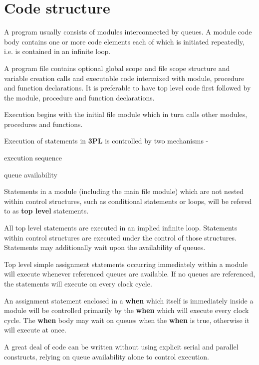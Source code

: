 \pagebreak

\chapter{Code structure}

    A program usually consists of modules interconnected by queues. A module
    code body contains one or more code elements each of which is initiated
    repeatedly, i.e. is contained in an infinite loop.

    A program file contains optional global scope and file scope structure and
    variable creation calls and executable code intermixed with module,
    procedure and function declarations. It is preferable to have
    top level code first followed by the module, procedure and function
    declarations.
    
    Execution begins with the initial file module which in turn calls other
    modules, procedures and functions.

    Execution of statements in {\bf 3PL} is controlled by two mechanisms -
    \blist
    \item    execution sequence
    \item    queue availability
    \blend
    
    Statements in a module (including the main file module) which are not nested
    within control structures, such as conditional statements or loops, will be
    refered to as {\bf top level} statements.

    All top level statements are executed in an implied infinite loop.
    Statements within control structures are executed under the control of those
    structures. Statements may additionally wait upon the availability of queues.

    Top level simple assignment statements occurring immediately within
    a module will execute whenever referenced queues are available.
    If no queues are referenced, the statements will execute on
    every clock cycle.

    An assignment statement enclosed in a {\bf when} which itself
    is immediately inside a module will be controlled primarily
    by the {\bf when} which will execute every clock cycle. The
    {\bf when} body may wait on queues when the {\bf when} is true,
    otherwise it will execute at once.

    A great deal of code can be written without using
    explicit serial and parallel constructs, relying on queue
    availability alone to control execution.

